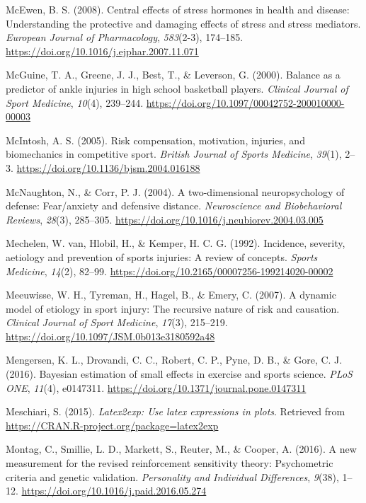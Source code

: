 \documentclass[man,floatsintext]{apa6}
\begin{document}
\leavevmode\hypertarget{ref-McEwen2008}{}%
McEwen, B. S. (2008). Central effects of stress hormones in health and disease: Understanding the protective and damaging effects of stress and stress mediators. \emph{European Journal of Pharmacology}, \emph{583}(2-3), 174--185. \url{https://doi.org/10.1016/j.ejphar.2007.11.071}

\leavevmode\hypertarget{ref-McGuine2000}{}%
McGuine, T. A., Greene, J. J., Best, T., \& Leverson, G. (2000). Balance as a predictor of ankle injuries in high school basketball players. \emph{Clinical Journal of Sport Medicine}, \emph{10}(4), 239--244. \url{https://doi.org/10.1097/00042752-200010000-00003}

\leavevmode\hypertarget{ref-McIntosh2005a}{}%
McIntosh, A. S. (2005). Risk compensation, motivation, injuries, and biomechanics in competitive sport. \emph{British Journal of Sports Medicine}, \emph{39}(1), 2--3. \url{https://doi.org/10.1136/bjsm.2004.016188}

\leavevmode\hypertarget{ref-McNaughton2004}{}%
McNaughton, N., \& Corr, P. J. (2004). A two-dimensional neuropsychology of defense: Fear/anxiety and defensive distance. \emph{Neuroscience and Biobehavioral Reviews}, \emph{28}(3), 285--305. \url{https://doi.org/10.1016/j.neubiorev.2004.03.005}

\leavevmode\hypertarget{ref-VanMechelen1992}{}%
Mechelen, W. van, Hlobil, H., \& Kemper, H. C. G. (1992). Incidence, severity, aetiology and prevention of sports injuries: A review of concepts. \emph{Sports Medicine}, \emph{14}(2), 82--99. \url{https://doi.org/10.2165/00007256-199214020-00002}

\leavevmode\hypertarget{ref-Meeuwisse2007}{}%
Meeuwisse, W. H., Tyreman, H., Hagel, B., \& Emery, C. (2007). A dynamic model of etiology in sport injury: The recursive nature of risk and causation. \emph{Clinical Journal of Sport Medicine}, \emph{17}(3), 215--219. \url{https://doi.org/10.1097/JSM.0b013e3180592a48}

\leavevmode\hypertarget{ref-Mengersen2016}{}%
Mengersen, K. L., Drovandi, C. C., Robert, C. P., Pyne, D. B., \& Gore, C. J. (2016). Bayesian estimation of small effects in exercise and sports science. \emph{PLoS ONE}, \emph{11}(4), e0147311. \url{https://doi.org/10.1371/journal.pone.0147311}

\leavevmode\hypertarget{ref-R-latex2exp}{}%
Meschiari, S. (2015). \emph{Latex2exp: Use latex expressions in plots}. Retrieved from \url{https://CRAN.R-project.org/package=latex2exp}

\leavevmode\hypertarget{ref-Reuter2015}{}%
Montag, C., Smillie, L. D., Markett, S., Reuter, M., \& Cooper, A. (2016). A new measurement for the revised reinforcement sensitivity theory: Psychometric criteria and genetic validation. \emph{Personality and Individual Differences}, \emph{9}(38), 1--12. \url{https://doi.org/10.1016/j.paid.2016.05.274}
\end{document}
